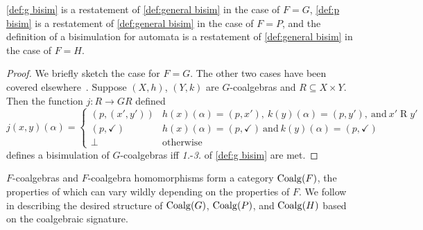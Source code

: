 \documentclass[orivec,envcountsect,envcountsame]{llncs}
\begin{document}
\begin{lemma}
	\cref{def:g bisim} is a restatement of \cref{def:general bisim} in the case of \(F = G\), \cref{def:p bisim} is a restatement of \cref{def:general bisim} in the case of \(F = P\), and the definition of a bisimulation for \GKAT automata is a restatement of \cref{def:general bisim} in the case of \(F = H\).
\end{lemma}

\begin{proof}
	We briefly sketch the case for $F = G$.
	The other two cases have been covered elsewhere~\cite{starmfps,gkatpopl}.
	Suppose \((X, h)\), \((Y, k)\) are \(G\)-coalgebras and \(R \subseteq X \times Y\).
	Then the function \(j : R \to GR\) defined
	\[
	j(x, y)(\alpha) = \begin{cases}
		(p, (x', y')) & h(x)(\alpha) = (p, x'),~k(y)(\alpha)=(p, y'),~\text{and}~x' \mathrel{R} y' \\
		(p, \checkmark) & h(x)(\alpha) = (p, \checkmark)~\text{and}~k(y)(\alpha)=(p, \checkmark) \\
		\bot & \text{otherwise}
	\end{cases}
	\]
	defines a bisimulation of \(G\)-coalgebras iff \emph{1.}-\emph{3.} of \cref{def:g bisim} are met.
\end{proof}

\(F\)-coalgebras and \(F\)-coalgebra homomorphisms form a category \(\operatorname{Coalg}(F)\), the properties of which can vary wildly depending on the properties of \(F\).
We follow~\cite{gumm} in describing the desired structure of \(\operatorname{Coalg}(G)\), \(\operatorname{Coalg}(P)\), and \(\operatorname{Coalg}(H)\) based on the coalgebraic signature.
\end{document}

